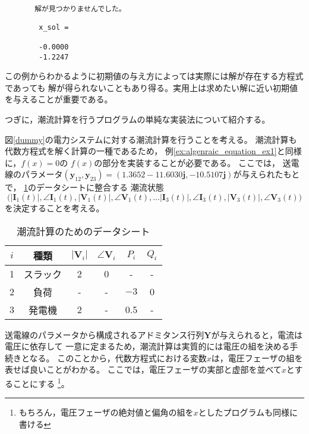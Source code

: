 {\begin{例}[簡単な例題]
\begin{実行結果}
\begin{verbatim}
       解が見つかりませんでした。
    \end{verbatim}
    \omitcode
    \begin{verbatim}
        x_sol =

        -0.0000
        -1.2247
    \end{verbatim}
\end{実行結果}

この例からわかるように初期値の与え方によっては実際には解が存在する方程式であっても
解が得られないこともあり得る。実用上は求めたい解に近い初期値を与えることが重要である。
\end{例}

つぎに，潮流計算を行うプログラムの単純な実装法について紹介する。
\begin{例}[潮流計算の解き方]\label{ex:simplepowerflow}
図\ref{dummy}の電力システムに対する潮流計算を行うことを考える。
潮流計算も代数方程式を解く計算の一種であるため，
例\nobreak\ref{ex:algenraic_equation_ex1}と同様に，$f(x)=0$の
$f(x)$の部分を実装することが必要である。
ここでは，
送電線のパラメータ$(\bm y_{12}, \bm y_{23})=(1.3652-11.6030\bm j, -10.5107 \bm j)$が与えられたもとで，
\ref{tab:datasheet_ex2}のデータシートに整合する
潮流状態
\[
\bigl(
|\bm{I}_1(t)|,\angle \bm{I}_1(t),
|\bm{V}_1(t)|,\angle \bm{V}_1(t),
\ldots
|\bm{I}_3(t)|,\angle \bm{I}_3(t),
|\bm{V}_3(t)|,\angle \bm{V}_3(t)
\bigr)
\]
を決定することを考える。
\begin{table}[htb]
    \centering
     \caption{潮流計算のためのデータシート}\label{tab:datasheet_ex2}
      \begin{tabular}{cccccc}
        $i$ & 種類 & $|\bm V_i|$ & $\angle \bm V_i$ & $P_i$ & $Q_i$\\\hline\hline
        1 & スラック & 2 & 0 & - & -\\
        2 & 負荷 & - & - & $-3$ & 0 \\
        3 & 発電機 & 2 & - & 0.5  & - \\
        \hline
      \end{tabular}
\end{table}
送電線のパラメータから構成されるアドミタンス行列$\bm Y$が与えられると，電流は電圧に依存して
一意に定まるため，潮流計算は実質的には電圧の組を決める手続きとなる。
このことから，代数方程式における変数$x$は，電圧フェーザの組を表せば良いことがわかる。
ここでは，電圧フェーザの実部と虚部を並べて$x$とすることにする
\footnote{もちろん，電圧フェーザの絶対値と偏角の組を$x$としたプログラムも同様に書ける}。


\end{例}}
